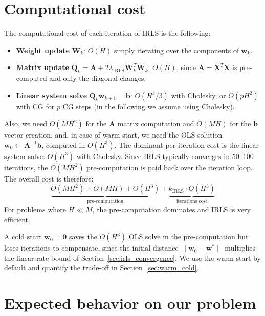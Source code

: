 \section{Computational cost}
\label{sec:irls_cost}

The computational cost of each iteration of IRLS is the following:
\begin{itemize}
    \item \textbf{Weight update} $\mathbf{W}_k$: $O(H)$ simply iterating over
    the components of $\mathbf{w}_k$.
    \item \textbf{Matrix update} $\mathbf{Q}_k = \mathbf{A} + 2\lambda_{\text{IRLS}}\mathbf{W}_k^T\mathbf{W}_k$: $O(H)$, since $\mathbf{A} = \mathbf{X}^T\mathbf{X}$ is pre-computed and only
    the diagonal changes.
    \item \textbf{Linear system solve} $\mathbf{Q}_k \mathbf{w}_{k+1} = \mathbf{b}$:
    $O(H^3/3)$ with Cholesky, or $O(pH^2)$ with CG for $p$ CG steps (in the following we assume using Cholesky).
\end{itemize}
Also, we need $O(MH^2)$ for the $\mathbf{A}$ matrix computation and $O(MH)$ for the $\mathbf{b}$ vector creation, and, in case of warm start, we need the OLS solution $\mathbf{w}_0 \leftarrow \mathbf{A}^{-1}\mathbf{b}$, computed in $O(H^3)$.
The dominant per-iteration cost is the linear system solve: $O(H^3)$ with Cholesky.
Since IRLS typically converges in $50$--$100$ iterations, the $O(MH^2)$ pre-computation
is paid back over the iteration loop. The overall cost is therefore:
$$\underbrace{O(MH^2) + O(MH) + O(H^3)}_{\text{pre-computation}} + \underbrace{k_{\mathrm{IRLS}} \cdot O(H^3)}_{\text{iterations cost}}$$
For problems where $H \ll M$, the pre-computation dominates and IRLS is very efficient.

A cold start $\mathbf{w}_0 = \mathbf{0}$ saves the $O(H^3)$ OLS solve in the pre-computation but loses iterations to compensate, since the initial distance $\|\mathbf{w}_0 - \mathbf{w}^*\|$ multiplies the linear-rate bound of Section~\ref{sec:irls_convergence}. We use the warm start by default and quantify the trade-off in Section~\ref{sec:warm_cold}.

\section{Expected behavior on our problem}
\label{sec:irls_expected}

